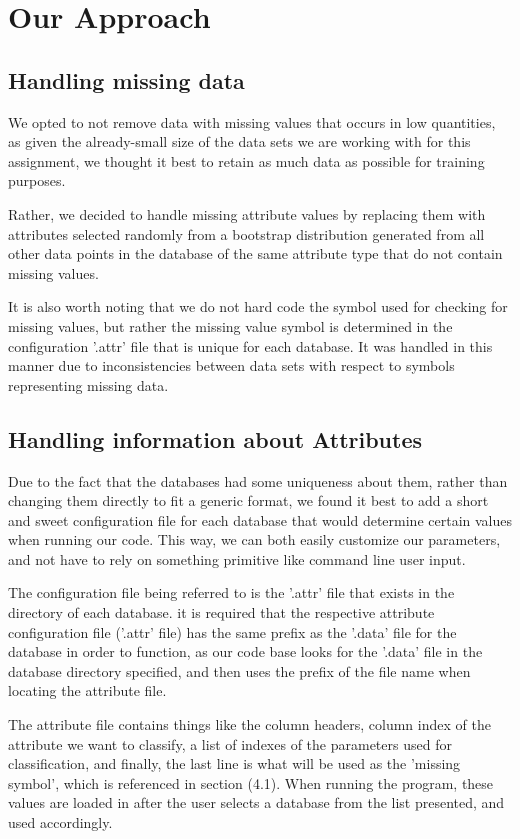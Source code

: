 \documentclass[twoside,11pt]{article}
\begin{document}
\section{Our Approach}
\subsection{Handling missing data}
 We opted to not remove data with missing values that occurs in low quantities, as given the already-small size of the data sets we are working with for this assignment, we thought it best to retain as much data as possible for training purposes.

Rather, we decided to handle missing attribute values by replacing them with attributes selected randomly from a bootstrap distribution generated from all other data points in the database of the same attribute type that do not contain missing values. 

It is also worth noting that we do not hard code the symbol used for checking for missing values, but rather the missing value symbol is determined in the configuration '.attr' file that is unique for each database. It was handled in this manner due to inconsistencies between data sets with respect to symbols representing missing data.

\subsection{Handling information about Attributes}
Due to the fact that the databases had some uniqueness about them, rather than changing them directly to fit a generic format, we found it best to add a short and sweet configuration file for each database that would determine certain values when running our code. This way, we can both easily customize our parameters, and not have to rely on something primitive like command line user input. 

The configuration file being referred to is the '.attr' file that exists in the directory of each database. it is required that the respective attribute configuration file ('.attr' file) has the same prefix as the '.data' file for the database in order to function, as our code base looks for the '.data' file in the database directory specified, and then uses the prefix of the file name when locating the attribute file. 

The attribute file contains things like the column headers, column index of the attribute we want to classify, a list of indexes of the parameters used for classification, and finally, the last line is what will be used as the 'missing symbol', which is referenced in section (4.1). When running the program, these values are loaded in after the user selects a database from the list presented, and used accordingly.
\end{document}
